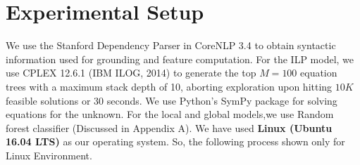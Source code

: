 \documentclass[document.tex]{subfiles}
\begin{document}
\section{Experimental Setup}
We use the Stanford Dependency Parser in CoreNLP 3.4\cite{32} to obtain syntactic information used for
grounding and feature computation. For the ILP
model, we use CPLEX 12.6.1 (IBM ILOG, 2014)\cite{33}
to generate the top $M = 100$ equation trees with
a maximum stack depth of 10, aborting exploration
upon hitting $10K$ feasible solutions or $30$ seconds.
We use Python’s SymPy package for solving equations for the unknown. For the local and global models,we use Random forest classifier \cite{34,35}(Discussed in Appendix A).
We have used \textbf{Linux (Ubuntu 16.04 LTS)} as our operating system. So, the following process shown only for Linux Environment.
%
%
%
\end{document}
